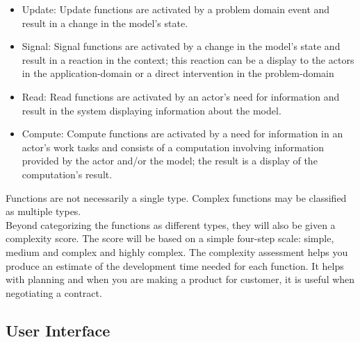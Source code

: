 \begin{itemize}
 
\item Update: Update functions are activated by a problem domain event and result in a change in the model’s state. 

\item Signal: Signal functions are activated by a change in the model’s state and result in a reaction in the context; this reaction can be a display to the actors in the application-domain or a direct intervention in the problem-domain 

\item Read: Read functions are activated by an actor’s need for information and result in the system displaying information about the model. 

\item Compute: Compute functions are activated by a need for information in an actor’s work tasks and consists of a computation involving information provided by the actor and/or the model; the result is a display of the computation’s result. 

\end{itemize}

Functions are not necessarily a single type. Complex functions may be classified as multiple types. \\

Beyond categorizing the functions as different types, they will also be given a complexity score. The score will be based on a simple four-step scale: simple, medium and complex and highly complex. The complexity assessment helps you produce an estimate of the development time needed for each function. It helps with planning and when you are making a product for customer, it is useful when negotiating a contract.



\subsection{User Interface}

